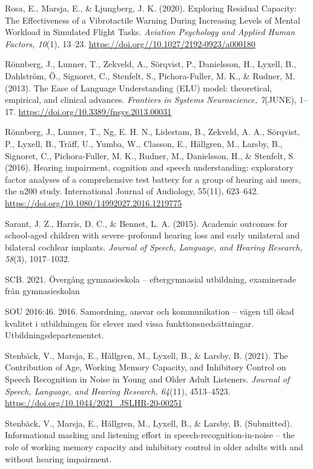 \documentclass[]{article}
\begin{document}
Rosa, E., Marsja, E., \& Ljungberg, J. K. (2020). Exploring Residual
Capacity: The Effectiveness of a Vibrotactile Warning During Increasing
Levels of Mental Workload in Simulated Flight Tasks. \emph{Aviation
Psychology and Applied Human Factors, 10}(1), 13--23.
\url{https://doi.org//10.1027/2192-0923/a000180}

Rönnberg, J., Lunner, T., Zekveld, A., Sörqvist, P., Danielsson, H.,
Lyxell, B., Dahlström, Ö., Signoret, C., Stenfelt, S., Pichora-Fuller,
M. K., \& Rudner, M. (2013). The Ease of Language Understanding (ELU)
model: theoretical, empirical, and clinical advances. \emph{Frontiers in
Systems Neuroscience, 7}(JUNE), 1--17.
\url{https://doi.org/10.3389/fnsys.2013.00031}

Rönnberg, J., Lunner, T., Ng, E. H. N., Lidestam, B., Zekveld, A. A.,
Sörqvist, P., Lyxell, B., Träff, U., Yumba, W., Classon, E., Hällgren,
M., Larsby, B., Signoret, C., Pichora-Fuller, M. K., Rudner, M.,
Danielsson, H., \& Stenfelt, S. (2016). Hearing impairment, cognition
and speech understanding: exploratory factor analyses of a comprehensive
test battery for a group of hearing aid users, the n200 study.
International Journal of Audiology, 55(11), 623--642.
\url{https://doi.org/10.1080/14992027.2016.1219775}

Sarant, J. Z., Harris, D. C., \& Bennet, L. A. (2015). Academic outcomes
for school-aged children with severe--profound hearing loss and early
unilateral and bilateral cochlear implants. \emph{Journal of Speech,
Language, and Hearing Research, 58}(3), 1017--1032.

SCB. 2021. Övergång gymnasieskola -- eftergymnasial utbildning,
examinerade från gymnasieskolan

SOU 2016:46. 2016. Samordning, ansvar och kommunikation -- vägen till
ökad kvalitet i utbildningen för elever med vissa
funktionsnedsättningar. Utbildningsdepartementet.

Stenbäck, V., Marsja, E., Hällgren, M., Lyxell, B., \& Larsby, B.
(2021). The Contribution of Age, Working Memory Capacity, and Inhibitory
Control on Speech Recognition in Noise in Young and Older Adult
Listeners. \emph{Journal of Speech, Language, and Hearing Research,
64}(11), 4513--4523. \url{https://doi.org/10.1044/2021_JSLHR-20-00251}

Stenbäck, V., Marsja, E., Hällgren, M., Lyxell, B., \& Larsby, B.
(Submitted). Informational masking and listening effort in
speech-recognition-in-noise -- the role of working memory capacity and
inhibitory control in older adults with and without hearing impairment.
\end{document}
